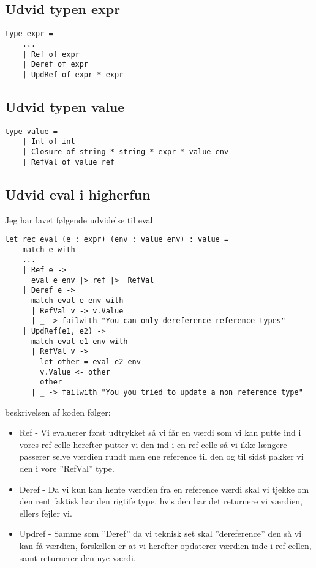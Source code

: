 \documentclass[11pt,a4paper]{article}
\begin{document}
\subsection{Udvid typen expr}
\begin{lstlisting}[style=fsharp]
type expr = 
    ...
    | Ref of expr
    | Deref of expr
    | UpdRef of expr * expr
\end{lstlisting}
\subsection{Udvid typen value}
\begin{lstlisting}[style=fsharp]
type value = 
    | Int of int
    | Closure of string * string * expr * value env
    | RefVal of value ref
\end{lstlisting}
\newpage
\subsection{Udvid eval i higherfun}
Jeg har lavet følgende udvidelse til eval
\begin{lstlisting}[style=fsharp]
let rec eval (e : expr) (env : value env) : value =
    match e with
    ...
    | Ref e -> 
      eval e env |> ref |>  RefVal
    | Deref e -> 
      match eval e env with
      | RefVal v -> v.Value
      | _ -> failwith "You can only dereference reference types"
    | UpdRef(e1, e2) ->
      match eval e1 env with
      | RefVal v -> 
        let other = eval e2 env
        v.Value <- other
        other
      | _ -> failwith "You you tried to update a non reference type"
\end{lstlisting}
beskrivelsen af koden følger:
\begin{itemize}
    \item Ref - Vi evaluerer først udtrykket så vi får en værdi som vi kan putte ind i vores ref celle herefter putter vi den ind i en ref celle så vi ikke længere passerer selve værdien rundt men ene reference til den og til sidst pakker vi den i vore ''RefVal'' type.
    \item Deref - Da vi kun kan hente værdien fra en reference værdi skal vi tjekke om den rent faktisk har den rigtife type, hvis den har det returnere vi værdien, ellers fejler vi.
    \item Updref - Samme som ''Deref'' da vi teknisk set skal ''dereference'' den så vi kan få værdien, forskellen er at vi herefter opdaterer værdien inde i ref cellen, samt returnerer den nye værdi.
\end{itemize}
\end{document}
